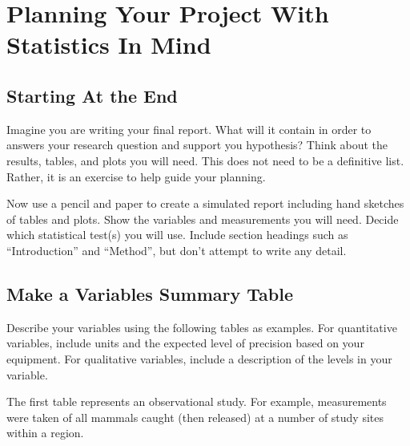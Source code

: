 \documentclass[
]{book}
\begin{document}
\chapter{Planning Your Project With Statistics In Mind}\label{planning-your-project-with-statistics-in-mind}

\section{Starting At the End}\label{starting-at-the-end}

Imagine you are writing your final report. What will it contain in order to answers your research question and support you hypothesis? Think about the results, tables, and plots you will need. This does not need to be a definitive list. Rather, it is an exercise to help guide your planning.

Now use a pencil and paper to create a simulated report including hand sketches of tables and plots. Show the variables and measurements you will need. Decide which statistical test(s) you will use. Include section headings such as ``Introduction'' and ``Method'', but don't attempt to write any detail.

\section{Make a Variables Summary Table}\label{make-a-variables-summary-table}

Describe your variables using the following tables as examples. For quantitative variables, include units and the expected level of precision based on your equipment. For qualitative variables, include a description of the levels in your variable.

The first table represents an observational study. For example, measurements were taken of all mammals caught (then released) at a number of study sites within a region.
\end{document}
